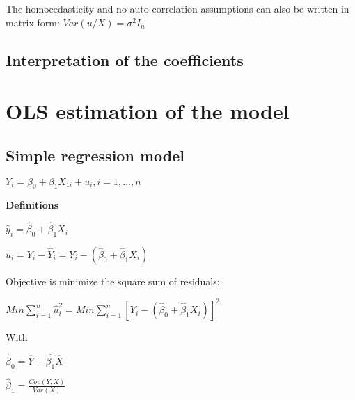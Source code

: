 \documentclass[10pt,landscape]{article}
\begin{document}
\begin{multicols}{3}
The homocedasticity and no auto-correlation assumptions can also be written in matrix form: $Var(u / X) = \sigma^2 I_n$

\subsection*{Interpretation of the coefficients}

\section*{OLS estimation of the model}

\subsection*{Simple regression model}

$Y_i = \beta_0 + \beta_1 X_{1i} + u_i, i = 1, ..., n$

\textbf{Definitions}

$\hat{y}_i = \hat{\beta}_0 + \hat{\beta}_1 X_i$

$\hat{u}_i = Y_i - \hat{Y}_i = Y_i - (\hat{\beta}_0 + \hat{\beta}_1 X_i)$

Objective is minimize the square sum of residuals:

$Min \sum_{i=1}^n \hat{u}_i^2 = Min \sum_{i=1}^n [Y_i - (\hat{\beta}_0 + \hat{\beta}_1 X_i)]^2$

With

$\hat{\beta}_0 = \overline{Y} - \hat{\beta_1} \overline{X}$

$\hat{\beta}_1 = \frac{Cov(Y, X)}{Var(X)}$


\end{multicols}
\end{document}
